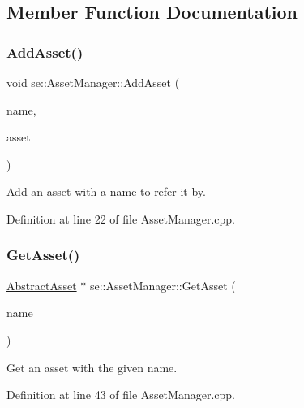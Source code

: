 \subsection{Member Function Documentation}
\mbox{\label{classse_1_1_asset_manager_aee43a38dbf19e852fed3f222808277af}} 
\subsubsection{\texorpdfstring{Add\+Asset()}{AddAsset()}}
{\footnotesize\ttfamily void se\+::\+Asset\+Manager\+::\+Add\+Asset (\begin{DoxyParamCaption}\item[{const std\+::string \&}]{name,  }\item[{\mbox{\hyperlink{classse_1_1_abstract_asset}{Abstract\+Asset}} $\ast$}]{asset }\end{DoxyParamCaption})}

Add an asset with a name to refer it by. 

Definition at line 22 of file Asset\+Manager.\+cpp.

\mbox{\label{classse_1_1_asset_manager_a24773ae49ec73911e46fbe0e1dce526d}} 
\subsubsection{\texorpdfstring{Get\+Asset()}{GetAsset()}}
{\footnotesize\ttfamily \mbox{\hyperlink{classse_1_1_abstract_asset}{Abstract\+Asset}} $\ast$ se\+::\+Asset\+Manager\+::\+Get\+Asset (\begin{DoxyParamCaption}\item[{const std\+::string \&}]{name }\end{DoxyParamCaption})}

Get an asset with the given name. 

Definition at line 43 of file Asset\+Manager.\+cpp.

\mbox{\label{classse_1_1_asset_manager_a9c1b0ad537778be7836568fdef953b05}} 

